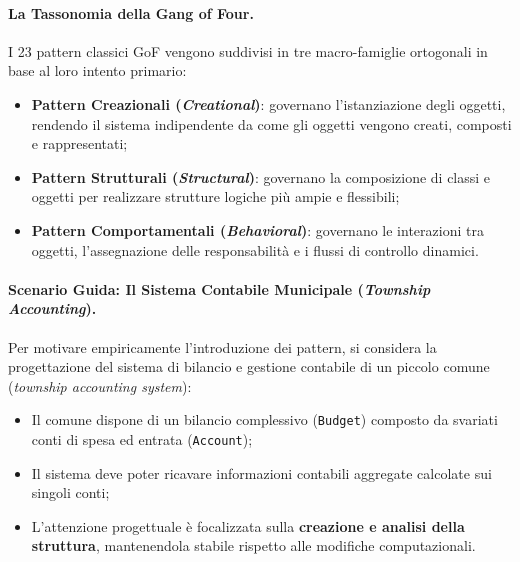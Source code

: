 \documentclass[12pt]{extarticle}
\begin{document}
\paragraph{La Tassonomia della Gang of Four.}
I 23 pattern classici GoF vengono suddivisi in tre macro-famiglie ortogonali in base al loro intento primario:
\begin{itemize}
    \item \textbf{Pattern Creazionali (\textit{Creational})}: governano l'istanziazione degli oggetti, rendendo il sistema indipendente da come gli oggetti vengono creati, composti e rappresentati;
    \item \textbf{Pattern Strutturali (\textit{Structural})}: governano la composizione di classi e oggetti per realizzare strutture logiche più ampie e flessibili;
    \item \textbf{Pattern Comportamentali (\textit{Behavioral})}: governano le interazioni tra oggetti, l'assegnazione delle responsabilità e i flussi di controllo dinamici.
\end{itemize}

\paragraph{Scenario Guida: Il Sistema Contabile Municipale (\textit{Township Accounting}).}
Per motivare empiricamente l'introduzione dei pattern, si considera la progettazione del sistema di bilancio e gestione contabile di un piccolo comune (\textit{township accounting system}):
\begin{itemize}
    \item Il comune dispone di un bilancio complessivo (\texttt{Budget}) composto da svariati conti di spesa ed entrata (\texttt{Account});
    \item Il sistema deve poter ricavare informazioni contabili aggregate calcolate sui singoli conti;
    \item L'attenzione progettuale è focalizzata sulla \textbf{creazione e analisi della struttura}, mantenendola stabile rispetto alle modifiche computazionali.
\end{itemize}
\end{document}
